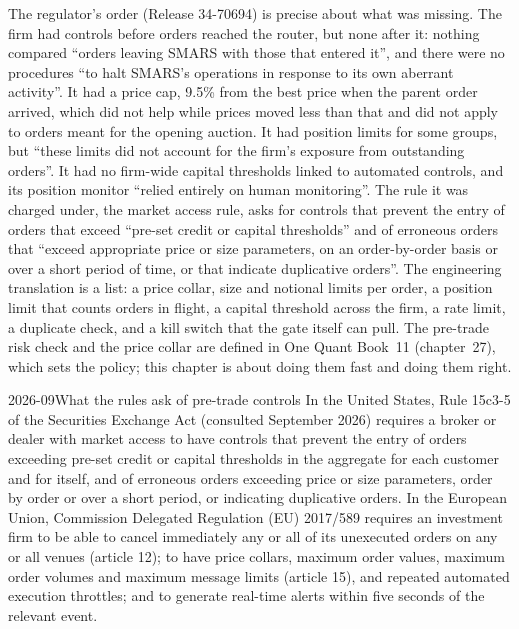 The regulator's order (Release 34-70694) is precise about what was missing. The firm had controls before orders reached the
router, but none after it: nothing compared ``orders leaving SMARS with those that entered it'', and there were no procedures
``to halt SMARS's operations in response to its own aberrant activity''. It had a price cap, 9.5\% from the best price when the
parent order arrived, which did not help while prices moved less than that and did not apply to orders meant for the opening
auction. It had position limits for some groups, but ``these limits did not account for the firm's exposure from outstanding
orders''. It had no firm-wide capital thresholds linked to automated controls, and its position monitor ``relied entirely on
human monitoring''. The rule it was charged under, the market access rule, asks for controls that prevent the entry of orders
that exceed ``pre-set credit or capital thresholds'' and of erroneous orders that ``exceed appropriate price or size
parameters, on an order-by-order basis or over a short period of time, or that indicate duplicative orders''. The engineering
translation is a list: a price collar, size and notional limits per order, a position limit that counts orders in flight, a
capital threshold across the firm, a rate limit, a duplicate check, and a kill switch that the gate itself can pull. The pre-trade
risk check and the price collar are defined in One Quant Book~11 (chapter~27), which sets the policy; this chapter is about
doing them fast and doing them right.

\begin{dated}{2026-09}{What the rules ask of pre-trade controls}\label{dat:ll:pre-trade-risk-and-kill-switches:rules}
In the United States, Rule 15c3-5 of the Securities Exchange Act (consulted September 2026) requires a broker or dealer with
market access to have controls that prevent the entry of orders exceeding pre-set credit or capital thresholds in the aggregate
for each customer and for itself, and of erroneous orders exceeding price or size parameters, order by order or over a short
period, or indicating duplicative orders. In the European Union, Commission Delegated Regulation (EU) 2017/589 requires an
investment firm to be able to cancel immediately any or all of its unexecuted orders on any or all venues (article 12); to have
price collars, maximum order values, maximum order volumes and maximum message limits (article 15), and repeated automated
execution throttles; and to generate real-time alerts within five seconds of the relevant event.
\end{dated}

